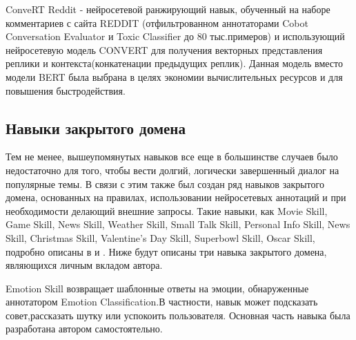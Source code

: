 \begin{table}[htbp]
\centering
\caption {Точность (перплексия) для генеративного навыка}
\label{tab:dream2}%
\end{table}



ConveRT Reddit - нейросетевой ранжирующий навык, обученный на наборе комментариев с сайта REDDIT \cite{na_website_ndu} (отфильтрованном аннотаторами Cobot Conversation Evaluator и Toxic Classifier до 80 тыс.примеров) и использующий нейросетевую модель CONVERT \cite{henderson_2019} для получения векторных представления реплики и контекста(конкатенации предыдущих реплик). Данная модель вместо модели BERT была выбрана в целях экономии вычислительных ресурсов и для повышения быстродействия.

\subsection{Навыки закрытого домена}

Тем не менее, вышеупомянутых навыков все еще в большинстве случаев было недостаточно для того, чтобы вести долгий, логически завершенный диалог на популярные темы. В связи с этим также был создан ряд навыков закрытого домена, основанных на правилах, использовании нейросетевых аннотаций и при необходимости делающий внешние запросы. Такие навыки, как Movie Skill, Game Skill, News Skill, Weather Skill, Small Talk Skill, Personal Info Skill, News Skill, Christmas Skill, Valentine’s Day Skill, Superbowl Skill, Oscar Skill, подробно описаны в \cite{dream1} и \cite{dream1_trudy}. Ниже будут описаны три навыка закрытого домена, являющихся личным вкладом автора.

Emotion Skill возвращает шаблонные ответы на эмоции, обнаруженные аннотатором Emotion Classification.В частности, навык может подсказать совет,рассказать шутку или успокоить пользователя. Основная часть навыка была разработана автором самостоятельно.

